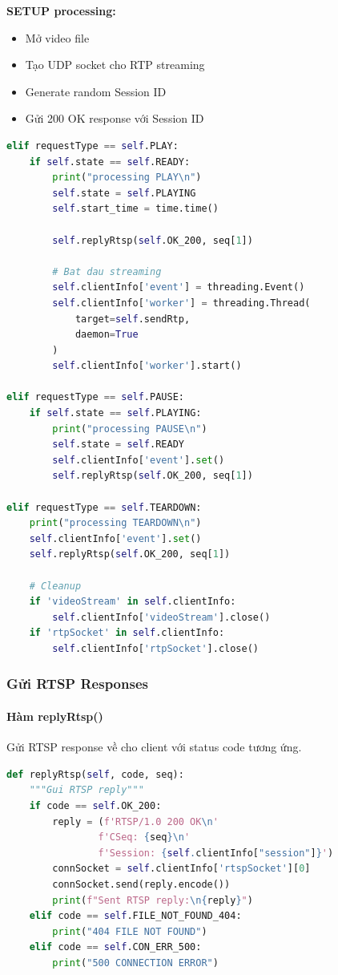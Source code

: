 \textbf{SETUP processing:}
\begin{itemize}
    \item Mở video file
    \item Tạo UDP socket cho RTP streaming
    \item Generate random Session ID
    \item Gửi 200 OK response với Session ID
\end{itemize}

\begin{lstlisting}[language=Python, caption={Process RTSP Request - PLAY/PAUSE/TEARDOWN}]
elif requestType == self.PLAY:
    if self.state == self.READY:
        print("processing PLAY\n")
        self.state = self.PLAYING
        self.start_time = time.time()

        self.replyRtsp(self.OK_200, seq[1])

        # Bat dau streaming
        self.clientInfo['event'] = threading.Event()
        self.clientInfo['worker'] = threading.Thread(
            target=self.sendRtp,
            daemon=True
        )
        self.clientInfo['worker'].start()

elif requestType == self.PAUSE:
    if self.state == self.PLAYING:
        print("processing PAUSE\n")
        self.state = self.READY
        self.clientInfo['event'].set()
        self.replyRtsp(self.OK_200, seq[1])

elif requestType == self.TEARDOWN:
    print("processing TEARDOWN\n")
    self.clientInfo['event'].set()
    self.replyRtsp(self.OK_200, seq[1])

    # Cleanup
    if 'videoStream' in self.clientInfo:
        self.clientInfo['videoStream'].close()
    if 'rtpSocket' in self.clientInfo:
        self.clientInfo['rtpSocket'].close()
\end{lstlisting}

\subsubsection{Gửi RTSP Responses}

\paragraph{Hàm replyRtsp()}
Gửi RTSP response về cho client với status code tương ứng.

\begin{lstlisting}[language=Python, caption={Reply RTSP}]
def replyRtsp(self, code, seq):
    """Gui RTSP reply"""
    if code == self.OK_200:
        reply = (f'RTSP/1.0 200 OK\n'
                f'CSeq: {seq}\n'
                f'Session: {self.clientInfo["session"]}')
        connSocket = self.clientInfo['rtspSocket'][0]
        connSocket.send(reply.encode())
        print(f"Sent RTSP reply:\n{reply}")
    elif code == self.FILE_NOT_FOUND_404:
        print("404 FILE NOT FOUND")
    elif code == self.CON_ERR_500:
        print("500 CONNECTION ERROR")
\end{lstlisting}

